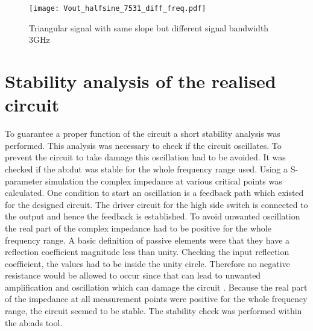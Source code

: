 \begin{figure}[htb!]
	\centering
  \texttt{[image: Vout\_halfsine\_7531\_diff\_freq.pdf]}
	\caption{Triangular signal with same slope but different signal bandwidth 3GHz}
	\label{fig:DiffSigBWSameSlopeTriangular}
\end{figure}


\section{Stability analysis of the realised circuit}
To guarantee a proper function of the circuit a short stability analysis was performed.
This analysis was necessary to check if the circuit oscillates.
To prevent the circuit to take damage this oscillation had to be avoided.
It was checked if the \gls{ab:dut} was stable for the whole frequency range used.
Using a S-parameter simulation the complex impedance at various critical points was calculated.
One condition to start an oscillation is a feedback path which existed for the designed circuit.
The driver circuit for the high side switch is connected to the output and hence the feedback is established.
To avoid unwanted oscillation the real part of the complex impedance had to be positive for the whole frequency range.
A basic definition of passive elements were that they have a reflection coefficient magnitude less than unity.
Checking the input reflection coefficient, the values had to be inside the unity circle.
Therefore no negative resistance would be allowed to occur since that can lead to unwanted amplification and oscillation which can damage the circuit \cite{GilmoreR.2003}.
Because the real part of the impedance at all measurement points were positive for the whole frequency range, the circuit seemed to be stable.
The stability check was performed within the \gls{ab:ads} tool. 

